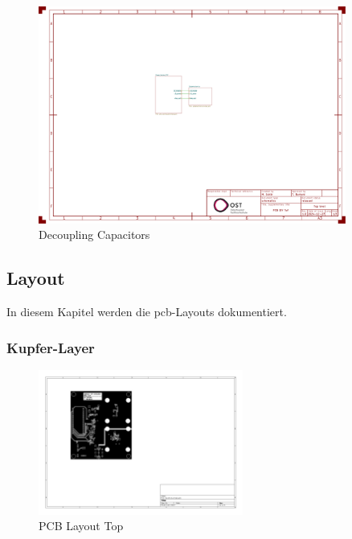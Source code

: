 \documentclass[11pt,a4paper,hidelinks]{article}
\begin{document}
\begin{figure}[H]
    \centering
    \includegraphics[page=3, trim=100 60 650 630, clip, width=0.9\textwidth]{attachments/schematic.pdf}
    \caption{Decoupling Capacitors}\label{fig:decoupling_capacitors}
\end{figure}

\pagebreak

\subsection{Layout}\label{sec:layout}

In diesem Kapitel werden die \acrshort{pcb}-Layouts dokumentiert.

\subsubsection{Kupfer-Layer}

\begin{figure}[H]
    \centering
    \includegraphics[trim=130 220 450 80, clip, width=0.6\textwidth]{attachments/pcb_F_Cu.pdf}
    \caption{PCB Layout Top}\label{fig:pcb_f_cu}
\end{figure}
\end{document}
